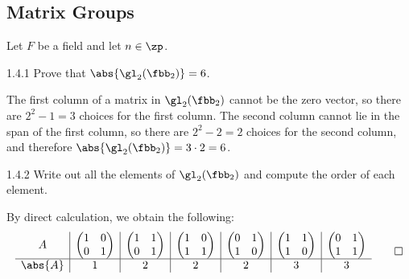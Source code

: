 \subsection{Matrix Groups}

Let $F$ be a field and let $n \in \zp$.

\begin{exercise}{1.4.1}
    Prove that $\abs{\gl_2(\fbb_2)} = 6$.
\end{exercise}

\begin{sol}
    The first column of a matrix in $\gl_2(\fbb_2)$ cannot be the zero vector, so there are $2^2 - 1 = 3$ choices for the first column.
    The second column cannot lie in the span of the first column, so there are $2^2 - 2 = 2$ choices for the second column, and therefore $\abs{\gl_2(\fbb_2)} = 3 \cdot 2 = 6$.
\end{sol}

\begin{exercise}{1.4.2}
    Write out all the elements of $\gl_2(\fbb_2)$ and compute the order of each element.
\end{exercise}

\begin{sol}
    By direct calculation, we obtain the following:
    \[
        \begin{array}{*{6}{c|}c}
            A & 
            \begin{pmatrix}
                1 & 0 \\
                0 & 1
            \end{pmatrix} & 
            \begin{pmatrix}
                1 & 1 \\
                0 & 1
            \end{pmatrix} &
            \begin{pmatrix}
                1 & 0 \\
                1 & 1
            \end{pmatrix} &
            \begin{pmatrix}
                0 & 1 \\
                1 & 0
            \end{pmatrix} &
            \begin{pmatrix}
                1 & 1 \\
                1 & 0
            \end{pmatrix} &
            \begin{pmatrix}
                0 & 1 \\
                1 & 1
            \end{pmatrix} \\
            \hline
            \abs{A} & 1 & 2 & 2 & 2 & 3 & 3
        \end{array} \qedhere
    \]
\end{sol}

